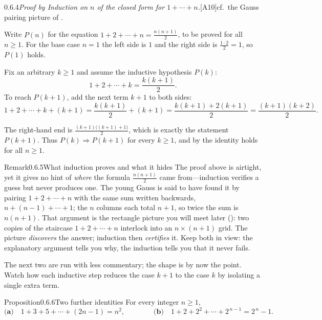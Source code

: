 \documentclass[main.tex]{subfiles}
\begin{document}
\begin{Prf}{0.6.4}{\itshape Proof by Induction on \texorpdfstring{$n$}{n} of the closed form for $1+\cdots+n$.}{[A10]\enspace cf.\ the Gauss pairing picture of .}
\item Write $P(n)$ for the equation $1+2+\cdots+n=\tfrac{n(n+1)}{2}$, to be proved for all $n\ge 1$.
For the base case $n=1$ the left side is $1$ and the right side is $\tfrac{1\cdot 2}{2}=1$, so $P(1)$
holds.
\item Fix an arbitrary $k\ge 1$ and assume the inductive hypothesis $P(k)$:
\[
1+2+\cdots+k=\frac{k(k+1)}{2}.
\]
To reach $P(k+1)$, add the next term $k+1$ to both sides:
\[
1+2+\cdots+k+(k+1)=\frac{k(k+1)}{2}+(k+1)
=\frac{k(k+1)+2(k+1)}{2}=\frac{(k+1)(k+2)}{2}.
\]
\item The right-hand end is $\tfrac{(k+1)\bigl((k+1)+1\bigr)}{2}$, which is exactly the statement
$P(k+1)$. Thus $P(k)\Rightarrow P(k+1)$ for every $k\ge 1$, and by  the identity holds for
all $n\ge 1$.
\end{Prf}

\begin{ObjL}{Remark}{0.6.5}{What induction proves and what it hides}
The proof above is airtight, yet it gives no hint of \emph{where} the formula $\tfrac{n(n+1)}{2}$ came
from---induction verifies a guess but never produces one. The young Gauss is said to have found it by
pairing $1+2+\cdots+n$ with the same sum written backwards, $n+(n-1)+\cdots+1$; the $n$ columns each
total $n+1$, so twice the sum is $n(n+1)$. That argument is the rectangle picture you will meet later
(): two copies of the staircase $1+2+\cdots+n$ interlock into an $n\times(n+1)$ grid. The
picture \emph{discovers} the answer; induction then \emph{certifies} it. Keep both in view: the
explanatory argument tells you why, the induction tells you that it never fails.
\end{ObjL}

\noindent The next two are run with less commentary; the shape is by now the point. Watch how each
inductive step reduces the case $k+1$ to the case $k$ by isolating a single extra term.

\begin{Obj}{Proposition}{0.6.6}{Two further identities}
For every integer $n\ge 1$,
\[
\textbf{(a)}\quad 1+3+5+\cdots+(2n-1)=n^2,
\qquad\qquad
\textbf{(b)}\quad 1+2+2^2+\cdots+2^{\,n-1}=2^{\,n}-1.
\]
\end{Obj}
\end{document}
